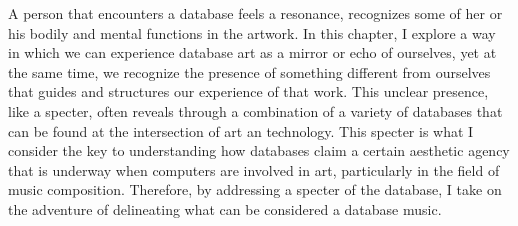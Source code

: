 A person that encounters a database feels a resonance, recognizes some of her or his bodily and mental functions in the artwork. In this chapter, I explore a way in which we can experience database art as a mirror or echo of ourselves, yet at the same time, we recognize the presence of something different from ourselves that guides and structures our experience of that work. This unclear presence, like a specter, often reveals through a combination of a variety of databases that can be found at the intersection of art an technology. This specter is what I consider the key to understanding how databases claim a certain aesthetic agency that is underway when computers are involved in art, particularly in the field of music composition. Therefore, by addressing a specter of the database, I take on the adventure of delineating what can be considered a database music.
